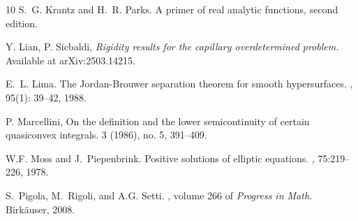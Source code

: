 \documentclass[10 pt,a4paper]{article}
\theoremstyle{definition}
\begin{document}
\begin{thebibliography}{10}
S.~G. Krantz and H.~R. Parks.
\newblock A primer of real analytic functions, second edition.


 Y. Lian, P. Sicbaldi, \emph{Rigidity results for the capillary overdetermined problem.} Available at arXiv:2503.14215. 


E.~L. Lima.
\newblock The Jordan-Brouwer separation theorem for smooth hypersurfaces.
, 95(1): 39--42, 1988.


P. Marcellini, 
\newblock On the definition and the lower semicontinuity of certain quasiconvex integrals.
 3 (1986), no. 5, 391--409.



W.F. Moss and J.~Piepenbrink.
\newblock Positive solutions of elliptic equations.
, 75:219--226, 1978.




S.~Pigola, M.~Rigoli, and A.G. Setti.
, volume 266 of {\em Progress in
  Math.}
\newblock Birk\"auser, 2008.


\end{thebibliography}
\end{document}
